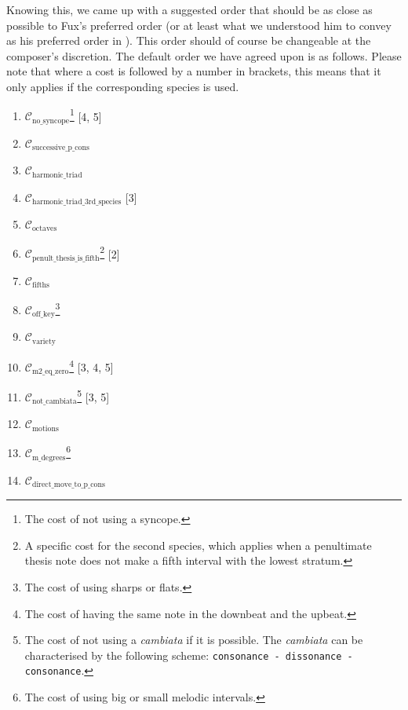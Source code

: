 Knowing this, we came up with a suggested order that should be as close as possible to Fux's preferred order (or at least what we understood him to convey as his preferred order in \gap). This order should of course be changeable at the composer's discretion. The default order we have agreed upon is as follows. Please note that where a cost is followed by a number in brackets, this means that it only applies if the corresponding species is used.
\begin{multicols}{2}
    \begin{enumerate}
        \item $\mathcal{C}_\text{no\_syncope}$\footnote{The cost of not using a syncope.} [4, 5] 
        \item $\mathcal{C}_\text{successive\_p\_cons}$
        \item $\mathcal{C}_\text{harmonic\_triad}$
        \item $\mathcal{C}_\text{harmonic\_triad\_3rd\_species}$ [3]
        \item $\mathcal{C}_\text{octaves}$
        \item $\mathcal{C}_\text{penult\_thesis\_is\_fifth}$\footnote{A specific cost for the second species, which applies when a penultimate thesis note does not make a fifth interval with the lowest stratum.} [2]
        \item $\mathcal{C}_\text{fifths}$
        \item $\mathcal{C}_\text{off\_key}$\footnote{The cost of using sharps or flats.}
        \item $\mathcal{C}_\text{variety}$
        \item $\mathcal{C}_\text{m2\_eq\_zero}$\footnote{The cost of having the same note in the downbeat and the upbeat.} [3, 4, 5]
        \item $\mathcal{C}_\text{not\_cambiata}$\footnote{The cost of not using a \textit{cambiata} if it is possible. The \textit{cambiata} can be characterised by the following scheme: \texttt{consonance - dissonance - consonance}.} [3, 5]
        \item $\mathcal{C}_\text{motions}$
        \item $\mathcal{C}_\text{m\_degrees}$\footnote{The cost of using big or small melodic intervals.}        
        \item $\mathcal{C}_\text{direct\_move\_to\_p\_cons}$
    \end{enumerate}
\end{multicols}


